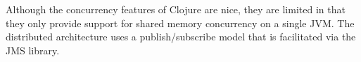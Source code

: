 Although the concurrency features of Clojure are nice, they are limited in that they only provide support for shared memory concurrency on a single JVM.  The distributed architecture uses a publish/subscribe model that is facilitated via the JMS library.

